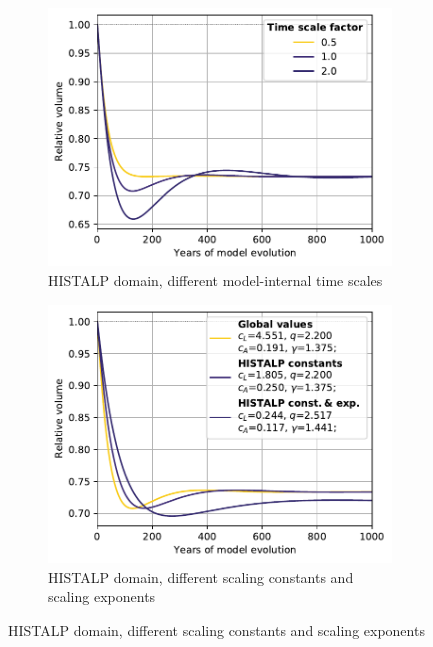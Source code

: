 \begin{figure}[ht]
      \begin{subfigure}[b]{0.476\textwidth}
        \caption{HISTALP domain, different model-internal time scales}
        \label{fig:sensitivity:time_scales_histalp}
        \centering
        \includegraphics[width=\textwidth]{../plots/final_plots/sensitivity/time_scales_histalp.pdf}
      \end{subfigure}
      \hfill
      \begin{subfigure}[b]{0.476\textwidth}
        \caption{HISTALP domain, different scaling constants and scaling exponents}
        \label{fig:sensitivity:scaling_params_histalp}
        \centering
        \includegraphics[width=\textwidth]{../plots/final_plots/sensitivity/scaling_params_histalp.pdf}
      \end{subfigure}
      

\end{figure}
